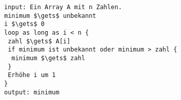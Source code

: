 %
%
\begin{minipage}{\linewidth}
\begin{lstlisting}[language=pseudocode, caption={Algorithmus für das Problem \protect\autoref{problem-minimum-n-zahlen}}, label={lst-algo-minimum-n-zahlen}]
input: Ein Array A mit n Zahlen.
minimum $\gets$ unbekannt
i $\gets$ 0
loop as long as i < n {
 zahl $\gets$ A[i]
 if minimum ist unbekannt oder minimum > zahl {
  minimum $\gets$ zahl
 }
 Erhöhe i um 1
}
output: minimum
\end{lstlisting}
\end{minipage}

